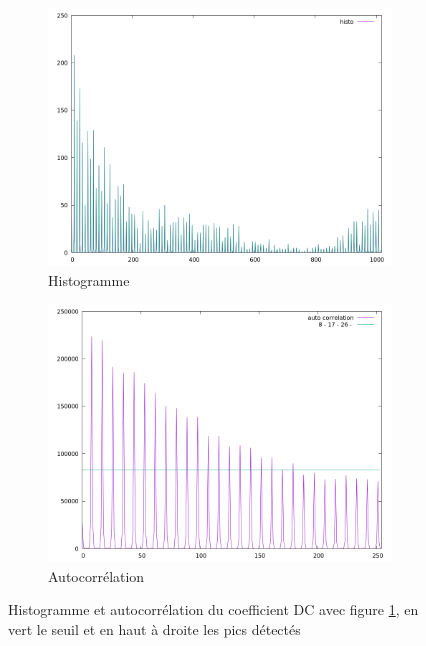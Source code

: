 \documentclass[utf8,final]{stageM2R} %
\begin{document}
\begin{figure}
  \begin{subfigure}{.5\textwidth}
    \centering
    \includegraphics[width=\linewidth]{images/histos/histo0}
    \caption{Histogramme}
  \end{subfigure}
  \begin{subfigure}{.5\textwidth}
    \centering
    \includegraphics[width=\linewidth]{images/histos/autocorrelation0}
    \caption{Autocorrélation}
    \label{fig:histo0_auto}
  \end{subfigure}
  \caption{Histogramme et autocorrélation du coefficient DC avec figure \ref{fig:histo0_auto}, en vert le seuil et en haut à droite les pics détectés}
  \label{fig:histo0}
\end{figure}
\end{document}
